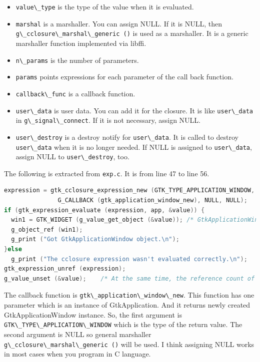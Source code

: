 \begin{itemize}
\tightlist
\item
  \passthrough{\lstinline!value\_type!} is the type of the value when it
  is evaluated.
\item
  \passthrough{\lstinline!marshal!} is a marshaller. You can assign
  NULL. If it is NULL, then
  \passthrough{\lstinline!g\_cclosure\_marshal\_generic ()!} is used as
  a marshaller. It is a generic marshaller function implemented via
  libffi.
\item
  \passthrough{\lstinline!n\_params!} is the number of parameters.
\item
  \passthrough{\lstinline!params!} points expressions for each parameter
  of the call back function.
\item
  \passthrough{\lstinline!callback\_func!} is a callback function.
\item
  \passthrough{\lstinline!user\_data!} is user data. You can add it for
  the closure. It is like \passthrough{\lstinline!user\_data!} in
  \passthrough{\lstinline!g\_signal\_connect!}. If it is not necessary,
  assign NULL.
\item
  \passthrough{\lstinline!user\_destroy!} is a destroy notify for
  \passthrough{\lstinline!user\_data!}. It is called to destroy
  \passthrough{\lstinline!user\_data!} when it is no longer needed. If
  NULL is assigned to \passthrough{\lstinline!user\_data!}, assign NULL
  to \passthrough{\lstinline!user\_destroy!}, too.
\end{itemize}

The following is extracted from \passthrough{\lstinline!exp.c!}. It is
from line 47 to line 56.

\begin{lstlisting}[language=C]
expression = gtk_cclosure_expression_new (GTK_TYPE_APPLICATION_WINDOW, NULL, 0, NULL,
               G_CALLBACK (gtk_application_window_new), NULL, NULL);
if (gtk_expression_evaluate (expression, app, &value)) {
  win1 = GTK_WIDGET (g_value_get_object (&value)); /* GtkApplicationWindow */
  g_object_ref (win1);
  g_print ("Got GtkApplicationWindow object.\n");
}else
  g_print ("The cclosure expression wasn't evaluated correctly.\n");
gtk_expression_unref (expression);
g_value_unset (&value);    /* At the same time, the reference count of win1 is decreased by one. */
\end{lstlisting}

The callback function is
\passthrough{\lstinline!gtk\_application\_window\_new!}. This function
has one parameter which is an instance of GtkApplication. And it returns
newly created GtkApplicationWindow instance. So, the first argument is
\passthrough{\lstinline!GTK\_TYPE\_APPLICATION\_WINDOW!} which is the
type of the return value. The second argument is NULL so general
marshaller \passthrough{\lstinline!g\_cclosure\_marshal\_generic ()!}
will be used. I think assigning NULL works in most cases when you
program in C language.

